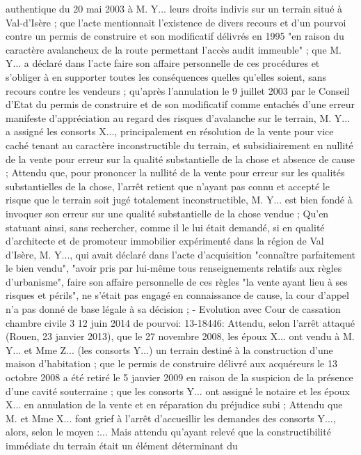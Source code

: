 \documentclass[11pt,a4paper]{report}
\begin{document}
	authentique du 20 mai 2003 à M. Y... leurs droits indivis sur un terrain situé à Val-d'Isère ; que l'acte
	mentionnait l'existence de divers recours et d'un pourvoi contre un permis de construire et son modificatif
	délivrés en 1995 "en raison du caractère avalancheux de la route permettant l'accès audit immeuble" ; que
	M. Y... a déclaré dans l'acte faire son affaire personnelle de ces procédures et s'obliger à en supporter toutes
	les conséquences quelles qu'elles soient, sans recours contre les vendeurs ; qu'après l'annulation le 9 juillet
	2003 par le Conseil d'Etat du permis de construire et de son modificatif comme entachés d'une erreur
	manifeste d'appréciation au regard des risques d'avalanche sur le terrain, M. Y... a assigné les consorts X...,
	principalement en résolution de la vente pour vice caché tenant au caractère inconstructible du terrain, et
	subsidiairement en nullité de la vente pour erreur sur la qualité substantielle de la chose et absence de cause
	;
	Attendu que, pour prononcer la nullité de la vente pour erreur sur les qualités substantielles de la chose,
	l'arrêt retient que n'ayant pas connu et accepté le risque que le terrain soit jugé totalement inconstructible,
	M. Y... est bien fondé à invoquer son erreur sur une qualité substantielle de la chose vendue ;
	Qu'en statuant ainsi, sans rechercher, comme il le lui était demandé, si en qualité d'architecte et de
	promoteur immobilier expérimenté dans la région de Val d'Isère, M. Y..., qui avait déclaré dans l'acte
	d'acquisition "connaître parfaitement le bien vendu", "avoir pris par lui-même tous renseignements relatifs
	aux règles d'urbanisme", faire son affaire personnelle de ces règles "la vente ayant lieu à ses risques et
	périls", ne s'était pas engagé en connaissance de cause, la cour d'appel n'a pas donné de base légale à sa
	décision ;
	- Evolution avec Cour de cassation chambre civile 3 12 juin 2014 \No  de pourvoi: 13-18446: Attendu,
	selon l'arrêt attaqué (Rouen, 23 janvier 2013), que le 27 novembre 2008, les époux X... ont vendu à M. Y... et
	Mme Z... (les consorts Y...) un terrain destiné à la construction d'une maison d'habitation ; que le permis de
	construire délivré aux acquéreurs le 13 octobre 2008 a été retiré le 5 janvier 2009 en raison de la suspicion
	de la présence d'une cavité souterraine ; que les consorts Y... ont assigné le notaire et les époux X... en
	annulation de la vente et en réparation du préjudice subi ;
	Attendu que M. et Mme X... font grief à l'arrêt d'accueillir les demandes des consorts Y..., alors, selon le
	moyen :...
	Mais attendu qu'ayant relevé que la constructibilité immédiate du terrain était un élément déterminant du
\end{document}
